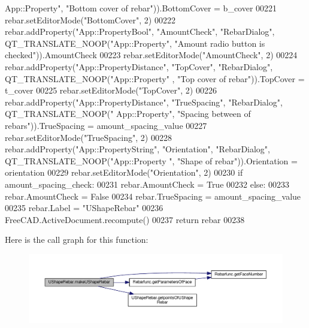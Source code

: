 \begin{DoxyCode}
{      App::Property"}, \textcolor{stringliteral}{"Bottom cover of rebar"})).BottomCover = b\_cover
00221     rebar.setEditorMode(\textcolor{stringliteral}{"BottomCover"}, 2)
00222     rebar.addProperty(\textcolor{stringliteral}{"App::PropertyBool"}, \textcolor{stringliteral}{"AmountCheck"}, \textcolor{stringliteral}{"RebarDialog"}, QT\_TRANSLATE\_NOOP(\textcolor{stringliteral}{"App::Property"},
       \textcolor{stringliteral}{"Amount radio button is checked"})).AmountCheck
00223     rebar.setEditorMode(\textcolor{stringliteral}{"AmountCheck"}, 2)
00224     rebar.addProperty(\textcolor{stringliteral}{"App::PropertyDistance"}, \textcolor{stringliteral}{"TopCover"}, \textcolor{stringliteral}{"RebarDialog"}, QT\_TRANSLATE\_NOOP(\textcolor{stringliteral}{"App::Property"}
      , \textcolor{stringliteral}{"Top cover of rebar"})).TopCover = t\_cover
00225     rebar.setEditorMode(\textcolor{stringliteral}{"TopCover"}, 2)
00226     rebar.addProperty(\textcolor{stringliteral}{"App::PropertyDistance"}, \textcolor{stringliteral}{"TrueSpacing"}, \textcolor{stringliteral}{"RebarDialog"}, QT\_TRANSLATE\_NOOP(\textcolor{stringliteral}{"
      App::Property"}, \textcolor{stringliteral}{"Spacing between of rebars"})).TrueSpacing = amount\_spacing\_value
00227     rebar.setEditorMode(\textcolor{stringliteral}{"TrueSpacing"}, 2)
00228     rebar.addProperty(\textcolor{stringliteral}{"App::PropertyString"}, \textcolor{stringliteral}{"Orientation"}, \textcolor{stringliteral}{"RebarDialog"}, QT\_TRANSLATE\_NOOP(\textcolor{stringliteral}{"App::Property
      "}, \textcolor{stringliteral}{"Shape of rebar"})).Orientation = orientation
00229     rebar.setEditorMode(\textcolor{stringliteral}{"Orientation"}, 2)
00230     \textcolor{keywordflow}{if} amount\_spacing\_check:
00231         rebar.AmountCheck = \textcolor{keyword}{True}
00232     \textcolor{keywordflow}{else}:
00233         rebar.AmountCheck = \textcolor{keyword}{False}
00234         rebar.TrueSpacing = amount\_spacing\_value
00235     rebar.Label = \textcolor{stringliteral}{"UShapeRebar"}
00236     FreeCAD.ActiveDocument.recompute()
00237     \textcolor{keywordflow}{return} rebar
00238 
\end{DoxyCode}


Here is the call graph for this function\+:\nopagebreak
\begin{figure}[H]
\begin{center}
\leavevmode
\includegraphics[width=350pt]{namespaceUShapeRebar_adb9f6e4b9ec41d7a1fdfe58ad174fec3_cgraph}
\end{center}
\end{figure}




